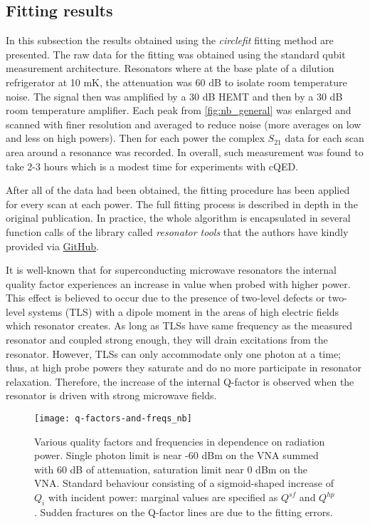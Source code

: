 \documentclass[12pt]{article}
\numberwithin{equation}{section}
\begin{document}
\subsection{Fitting results}

In this subsection the results obtained using the \textit{circlefit} fitting method are presented.
The raw data for the fitting was obtained using the standard qubit measurement architecture. Resonators where at the base plate of a dilution refrigerator at 10 mK, the attenuation was 60 dB to isolate room temperature noise. The signal then was amplified by a 30 dB HEMT and then by a 30 dB room temperature amplifier. Each peak from \autoref{fig:nb_general} was enlarged and scanned with finer resolution and averaged to reduce noise (more averages on low and less on high powers). Then for each power the complex $S_{21}$ data for each scan area around a resonance was recorded. In overall, such measurement was found to take 2-3 hours which is a modest time for experiments with cQED.

After all of the data had been obtained, the fitting procedure has been applied for every scan at each power. The full fitting process is described in depth in the original publication\cite{probst2015}. In practice, the whole algorithm is encapsulated in several function calls of the library called \textit{resonator tools} that the authors have kindly provided via \href{https://github.com/sebastianprobst/resonatortools}{GitHub}.

It is well-known\cite{wang2009} that for superconducting microwave resonators the internal quality factor experiences an increase in value when probed with higher power. This effect is believed to occur due to the presence of two-level defects or two-level systems (TLS) with a dipole moment in the areas of high electric fields which resonator creates. As long as TLSs have same frequency as the measured resonator and coupled strong enough, they will drain excitations from the resonator. However, TLSs can only accommodate only one photon at a time; thus, at high probe powers they saturate and do no more participate in resonator relaxation. Therefore, the increase of the internal Q-factor is observed when the resonator is driven with strong microwave fields.

\begin{figure}

\hspace{-0.7cm}
\texttt{[image: q-factors-and-freqs\_nb]}
\caption{Various quality factors and frequencies in dependence on radiation power. Single photon limit is near -60 dBm on the VNA summed with 60 dB of attenuation, saturation limit near 0 dBm on the VNA. Standard behaviour consisting of a sigmoid-shaped increase of $Q_i$ with incident power: marginal values are specified as $Q^{sf}$ and $Q^{hp}$. Sudden fractures on the Q-factor lines are due to the fitting errors.}
\label{fig:q_factors_nb}
\end{figure}
\end{document}
